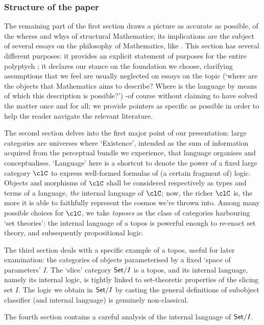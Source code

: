 \subsubsection{Structure of the paper}
The remaining part of the first section draws a picture as accurate as possible, of the wheres and whys of structural Mathematics; its implications are the subject of several essays on the philosophy of Mathematics, like \cite{kromer2007tool,Marquis1997,marquis2010category,marquis2008geometrical}. This section has several different purposes: it provides an explicit statement of purposes for the entire polyptych \cite{black,homot}; it declares our stance on the foundation we choose, clarifying assumptions that we feel are usually neglected on essays on the topic (`where are the objects that Mathematics aims to describe? Where is the language by means of which this description is possible?') -of course without claiming to have solved the matter once and for all; we provide pointers as specific as possible in order to help the reader navigate the relevant literature.

The second section delves into the first major point of our presentation: large categories are universes where `Existence', intended as the sum of information acquired from the perceptual bundle we experience, that language organises and conceptualises. `Language' here is a shortcut to denote the power of a fixed large category $\clC$ to express well-formed formulas of (a certain fragment of) logic. Objects and morphisms of $\clC$ shall be considered respectively as types and terms of a language, \emph{the} internal language of $\clC$; now, the richer $\clC$ is, the more it is able to faithfully represent the cosmos we're thrown into. Among many possible choices for $\clC$, we take \emph{toposes} as the class of categories harbouring `set theories': the internal language of a topos is powerful enough to re-enact set theory, and subsequently propositional logic.

The third section deals with a specific example of a topos, useful for later examination: the categories of objects parameterised by a fixed `space of parameters' $I$. The `slice' category $\mathsf{Set}/I$ is a topos, and its internal language, namely its internal logic, is tightly linked to set-theoretic properties of the slicing set $I$. The logic we obtain in $\mathsf{Set}/I$ by casting the general definitions of subobject classifier (and internal language) is genuinely non-classical.

The fourth section contains a careful analysis of the internal language of $\mathsf{Set}/I$.

